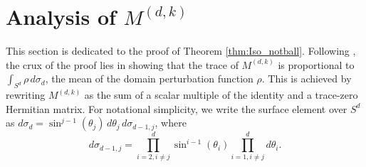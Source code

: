 \documentclass[11pt]{amsart}
\theoremstyle{definition}
\theoremstyle{plain}
\theoremstyle{remark}
\begin{document}


\section{Analysis of $M^{(d, k)}$} \label{sec:trace} 
This section is dedicated to the proof of Theorem \ref{thm:Iso_notball}. Following \cite[Theorem 1.1]{viator2022}, the crux of the proof lies in showing that the trace of $M^{(d, k)}$ is proportional to $\int_{S^d} \rho\, d\sigma_d$, the mean of the domain perturbation function $\rho$. This is achieved by rewriting $M^{(d,k)}$ as the sum of a scalar multiple of the identity and a trace-zero Hermitian matrix. For notational simplicity, we write the surface element over $S^d$ as $d\sigma_d = \sin^{j - 1}(\theta_j)\, d\theta_j\, d\sigma_{d - 1, j}$, where 
\begin{equation*} 
d\sigma_{d - 1, j} = \prod_{i = 2, i\neq j}^d \sin^{i - 1}(\theta_i)\prod_{i = 1, i\neq j}^d d\theta_i. 
\end{equation*}
\end{document}
